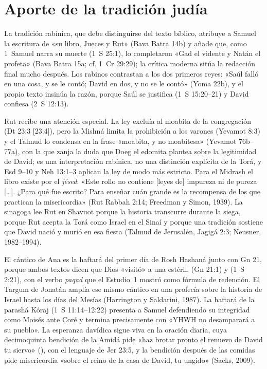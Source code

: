 \section{Aporte de la tradición judía}

La tradición rabínica, que debe distinguirse del texto bíblico, atribuye a Samuel la escritura de «su libro, Jueces y Rut» (Bava Batra 14b) y añade que, como 1~Samuel narra su muerte (1~S 25:1), lo completaron «Gad el vidente y Natán el profeta» (Bava Batra 15a; cf. 1~Cr 29:29); la crítica moderna sitúa la redacción final mucho después. Los rabinos contrastan a los dos primeros reyes: «Saúl falló en una cosa, y se le contó; David en dos, y no se le contó» (Yoma 22b), y el propio texto insinúa la razón, porque Saúl se justifica (1~S 15:20--21) y David confiesa (2~S 12:13).

Rut recibe una atención especial. La ley excluía al moabita de la congregación (Dt 23:3 [23:4]), pero la Mishná limita la prohibición a los varones (Yevamot 8:3) y el Talmud lo condensa en la frase «moabita, y no moabitesa» (Yevamot 76b--77a), con la que zanja la duda que Doeg el edomita plantea sobre la legitimidad de David; es una interpretación rabínica, no una distinción explícita de la Torá, y Esd 9--10 y Neh 13:1--3 aplican la ley de modo más estricto. Para el Midrash el libro existe por el \emph{jésed}: «Este rollo no contiene [leyes de] impureza ni de pureza [\ldots]. ¿Para qué fue escrito? Para enseñar cuán grande es la recompensa de los que practican la misericordia» (Rut Rabbah 2:14; Freedman y Simon, 1939). La sinagoga lee Rut en Shavuot porque la historia transcurre durante la siega, porque Rut acepta la Torá como Israel en el Sinaí y porque una tradición sostiene que David nació y murió en esa fiesta (Talmud de Jerusalén, Jagigá 2:3; Neusner, 1982--1994).

El cántico de Ana es la haftará del primer día de Rosh Hashaná junto con Gn 21, porque ambos textos dicen que Dios «visitó» a una estéril,  (Gn 21:1) y  (1~S 2:21), con el verbo \emph{paqad} que el Estudio~1 mostró como fórmula de redención. El Targum de Jonatán amplía ese mismo cántico en una profecía sobre la historia de Israel hasta los días del Mesías (Harrington y Saldarini, 1987). La haftará de la parashá Kóraj (1~S 11:14--12:22) presenta a Samuel defendiendo su integridad como Moisés ante Coré y termina precisamente con «YHWH no desamparará a su pueblo». La esperanza davídica sigue viva en la oración diaria, cuya decimoquinta bendición de la Amidá pide «haz brotar pronto el renuevo de David tu siervo» (), con el lenguaje de Jer 23:5, y la bendición después de las comidas pide misericordia «sobre el reino de la casa de David, tu ungido» (Sacks, 2009).

